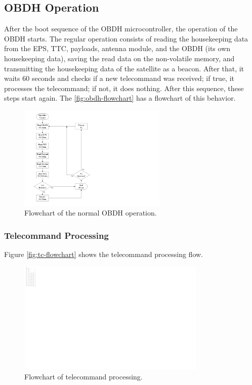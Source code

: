 \subsection{OBDH Operation}

After the boot sequence of the OBDH microcontroller, the operation of the OBDH starts. The regular operation consists of reading the housekeeping data from the EPS, TTC, payloads, antenna module, and the OBDH (its own housekeeping data), saving the read data on the non-volatile memory, and transmitting the housekeeping data of the satellite as a beacon. After that, it waits 60 seconds and checks if a new telecommand was received; if true, it processes the telecommand; if not, it does nothing. After this sequence, these steps start again. The \autoref{fig:obdh-flowchart} has a flowchart of this behavior.

\begin{figure}[!htb]
    \begin{center}
        \includegraphics[width=0.63\textwidth]{figures/obdh-flowchart.pdf}
        \caption{Flowchart of the normal OBDH operation.}
        \label{fig:obdh-flowchart}
    \end{center}
\end{figure}

\subsubsection{Telecommand Processing}

Figure \autoref{fig:tc-flowchart} shows the telecommand processing flow.

\begin{figure}[!htb]
    \begin{center}
        \includegraphics[width=0.8\textwidth]{figures/tc-flowchart.pdf}
        \caption{Flowchart of telecommand processing.}
        \label{fig:tc-flowchart}
    \end{center}
\end{figure}


